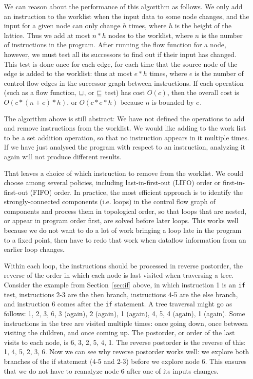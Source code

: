 \documentclass[11pt]{article}
\begin{document}
We can reason about the performance of this algorithm as follows.  We only add
an instruction to the worklist when the input data to some node changes, and the
input for a given node can only change $h$ times, where $h$ is the height of the
lattice.  Thus we add at most $n*h$ nodes to the worklist, where $n$ is the
number of instructions in the program.  After running the flow function for a
node, however, we must test all its successors to find out if their input has
changed.  This test is done once for each edge, for each time that the source
node of the edge is added to the worklist: thus at most $e*h$ times, where $e$
is the number of control flow edges in the successor graph between instructions.
If each operation (such as a flow function, $\sqcup$, or $\sqsubseteq$ test) has cost
$O(c)$, then the overall cost is $O(c * (n+e) * h)$, or $O(c*e*h)$ because $n$
is bounded by $e$.

The algorithm above is still abstract: We have not defined the operations to add
and remove instructions from the worklist.  We would like adding to the work
list to be a set addition operation, so that no instruction appears in it
multiple times.  If we have just analysed the program with respect to an
instruction, analyzing it again will not produce different results.

That leaves a choice of which instruction to remove from the worklist.  We could
choose among several policies, including last-in-first-out (LIFO) order or
first-in-first-out (FIFO) order.  In practice, the most efficient approach is to
identify the strongly-connected components (i.e. loops) in the control flow
graph of components and process them in topological order, so that loops that
are nested, or appear in program order first, are solved before later loops.
This works well because we do not want to do a lot of work bringing a loop late
in the program to a fixed point, then have to redo that work when dataflow
information from an earlier loop changes.

Within each loop, the instructions should be processed in reverse postorder, the
reverse of the order in which each node is last visited when traversing a tree.
Consider the example from Section~\ref{sec:if} above, in which instruction 1 is
an \texttt{if} test, instructions 2-3 are the then branch, instructions 4-5 are
the else branch, and instruction 6 comes after the \texttt{if} statement.  A
tree traversal might go as follows: 1, 2, 3, 6, 3 (again), 2 (again), 1 (again),
4, 5, 4 (again), 1 (again).  Some instructions in the tree are visited multiple
times: once going down, once between visiting the children, and once coming up.
The postorder, or order of the last visits to each node, is 6, 3, 2, 5, 4, 1.
The reverse postorder is the reverse of this: 1, 4, 5, 2, 3, 6.  Now we can see
why reverse postorder works well: we explore both branches of the if statement
(4-5 and 2-3) before we explore node 6.  This ensures that we do not have to
reanalyze node 6 after one of its inputs changes.
\end{document}
